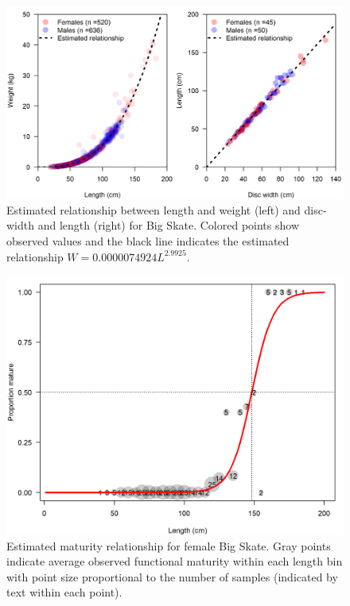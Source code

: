 \documentclass[12pt,]{article}
\begin{document}
\begin{figure}
\centering
\includegraphics{Figures/Big Skate bio relationships.png}
\caption{Estimated relationship between length and weight (left) and
disc-width and length (right) for Big Skate. Colored points show
observed values and the black line indicates the estimated relationship
\(W = 0.0000074924L^{2.9925}\).\label{fig:weight-length}}
\end{figure}

\begin{figure}
\centering
\includegraphics{Figures/BigSkate_maturity.png}
\caption{Estimated maturity relationship for female Big Skate. Gray
points indicate average observed functional maturity within each length
bin with point size proportional to the number of samples (indicated by
text within each point).\label{fig:maturity}}
\end{figure}
\end{document}
